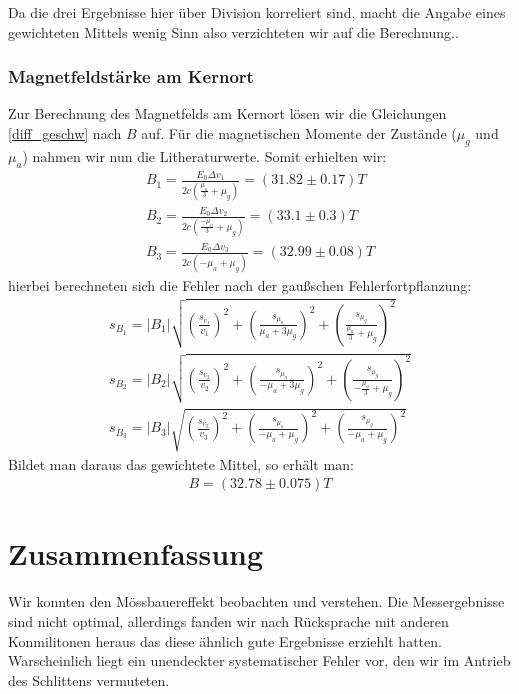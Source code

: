\documentclass[12pt]{article}
\begin{document}
Da die drei Ergebnisse hier über Division korreliert sind, macht die Angabe eines gewichteten Mittels wenig Sinn also verzichteten wir auf die Berechnung..

\subsubsection{Magnetfeldstärke am Kernort}
Zur Berechnung des Magnetfelds am Kernort lösen wir die Gleichungen \ref{diff_geschw} nach $B$ auf. Für die magnetischen Momente der Zustände ($\mu_g$ 
und $\mu_a$) nahmen wir nun die Litheraturwerte. Somit erhielten wir:
\begin{align*}
 B_1 = \frac{E_0 \Delta v_1}{2c \left( \frac{\mu_a}{3}+\mu_g \right) } = (31.82\pm0.17)T \\
 B_2 = \frac{E_0 \Delta v_2}{2c \left( \frac{-\mu_a}{3}+\mu_g \right) } = (33.1\pm0.3)T \\
 B_3 = \frac{E_0 \Delta v_3}{2c \left( -\mu_a+\mu_g \right) } = (32.99\pm0.08)T
\end{align*}
hierbei berechneten sich die Fehler nach der gaußschen Fehlerfortpflanzung:
\begin{align*}
 s_{B_1} = \left| B_1 \right| \sqrt{\left( \frac{s_{v_1}}{v_1} \right) ^2 + \left( \frac{s_{\mu_a}}{\mu_a+3\mu_g} \right) ^2 + \left( \frac{s_{\mu_g}}{\frac{\mu_a}{3}+\mu_g} \right) ^2} \\
 s_{B_2} = \left| B_2 \right| \sqrt{\left( \frac{s_{v_2}}{v_2} \right) ^2 + \left( \frac{s_{\mu_a}}{-\mu_a+3\mu_g} \right) ^2 + \left( \frac{s_{\mu_g}}{-\frac{\mu_a}{3}+\mu_g} \right) ^2} \\
 s_{B_3} = \left| B_3 \right| \sqrt{\left( \frac{s_{v_3}}{v_3} \right) ^2 + \left( \frac{s_{\mu_a}}{-\mu_a+\mu_g} \right) ^2 + \left( \frac{s_{\mu_g}}{-\mu_a+\mu_g} \right) ^2} 
\end{align*}
Bildet man daraus das gewichtete Mittel, so erhält man:
\begin{align*}
 B = (32.78 \pm 0.075)T
\end{align*}

\section{Zusammenfassung}
Wir konnten den Mössbauereffekt beobachten und verstehen. Die Messergebnisse sind nicht optimal, allerdings fanden wir nach Rücksprache mit anderen
Konmilitonen heraus das diese ähnlich gute Ergebnisse erziehlt hatten. Warscheinlich liegt ein unendeckter systematischer Fehler vor, den wir im Antrieb des Schlittens vermuteten.
\end{document}
